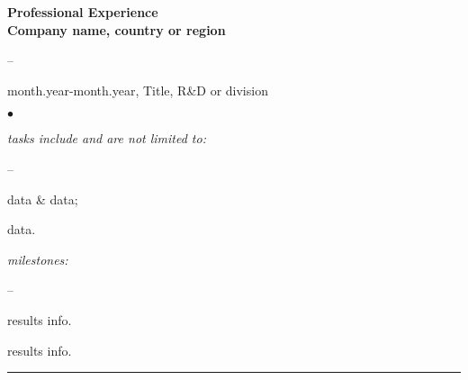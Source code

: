 \documentclass[oneside,final,10pt]{extreport}
\newenvironment{compactlist}{
	\begin{list}{{$\bullet$}}{
		\setlength\leftmargin{0.4cm}
		\setlength\partopsep{0pt}
		\setlength\parskip{0pt}
		\setlength\parsep{0pt}
		\setlength\topsep{0pt}
		\setlength\itemsep{0pt}
	}
}{
	\end{list}
}
\newenvironment{innerlist}{
	\begin{list}{--}{
		\setlength\leftmargin{0.8cm}
		\setlength\partopsep{0pt}
		\setlength\parskip{0pt}
		\setlength\parsep{0pt}
		\setlength\topsep{0pt}
		\setlength\itemsep{0pt}
	}
}{
	\end{list}
}
\begin{document}
\bfseries
Professional Experience \\
\mdseries
Company name, country or region
\mdseries
	\begin{innerlist}
		\bfseries
		\item month.year-month.year, Title, R\&D or division
		\mdseries
			\begin{compactlist}
				\item \textsl{tasks include and are not limited to:}
					\begin{innerlist}
						\item data \& data;
						\item data. 
					\end{innerlist}
				\item \textsl{milestones:}
					\begin{innerlist}
						\item results info.
						\item results info.\\[1pt]
					\end{innerlist}
			\end{compactlist}
	\end{innerlist}

\rule{\textwidth}{0.4pt}
\end{document}
